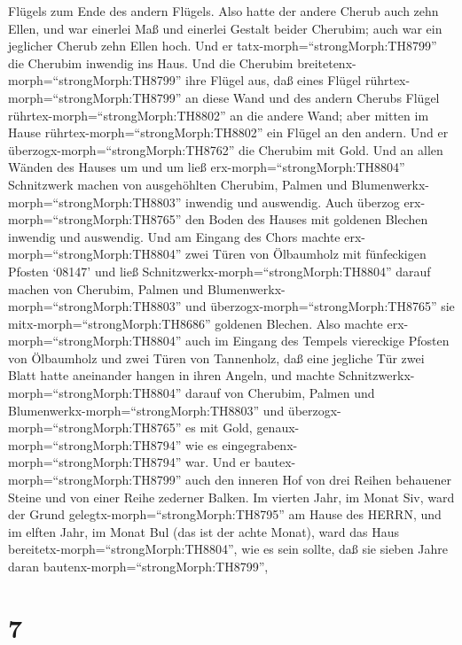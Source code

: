 Flügels zum Ende des andern Flügels.  Also hatte der andere
Cherub auch zehn Ellen, und war einerlei Maß und einerlei Gestalt beider
Cherubim;  auch war ein jeglicher Cherub zehn Ellen hoch.
 Und er tatx-morph=``strongMorph:TH8799'' die Cherubim
inwendig ins Haus. Und die Cherubim
breitetenx-morph=``strongMorph:TH8799'' ihre Flügel aus, daß eines
Flügel rührtex-morph=``strongMorph:TH8799'' an diese Wand und des andern
Cherubs Flügel rührtex-morph=``strongMorph:TH8802'' an die andere Wand;
aber mitten im Hause rührtex-morph=``strongMorph:TH8802'' ein Flügel an
den andern.  Und er überzogx-morph=``strongMorph:TH8762''
die Cherubim mit Gold.  Und an allen Wänden des Hauses um
und um ließ erx-morph=``strongMorph:TH8804'' Schnitzwerk machen von
ausgehöhlten Cherubim, Palmen und
Blumenwerkx-morph=``strongMorph:TH8803'' inwendig und auswendig.
 Auch überzog erx-morph=``strongMorph:TH8765'' den Boden
des Hauses mit goldenen Blechen inwendig und auswendig. 
Und am Eingang des Chors machte erx-morph=``strongMorph:TH8804'' zwei
Türen von Ölbaumholz mit fünfeckigen Pfosten  `08147' und
ließ Schnitzwerkx-morph=``strongMorph:TH8804'' darauf machen von
Cherubim, Palmen und Blumenwerkx-morph=``strongMorph:TH8803'' und
überzogx-morph=``strongMorph:TH8765'' sie
mitx-morph=``strongMorph:TH8686'' goldenen Blechen.  Also
machte erx-morph=``strongMorph:TH8804'' auch im Eingang des Tempels
viereckige Pfosten von Ölbaumholz  und zwei Türen von
Tannenholz, daß eine jegliche Tür zwei Blatt hatte aneinander hangen in
ihren Angeln,  und machte
Schnitzwerkx-morph=``strongMorph:TH8804'' darauf von Cherubim, Palmen
und Blumenwerkx-morph=``strongMorph:TH8803'' und
überzogx-morph=``strongMorph:TH8765'' es mit Gold,
genaux-morph=``strongMorph:TH8794'' wie es
eingegrabenx-morph=``strongMorph:TH8794'' war.  Und er
bautex-morph=``strongMorph:TH8799'' auch den inneren Hof von drei Reihen
behauener Steine und von einer Reihe zederner Balken.  Im
vierten Jahr, im Monat Siv, ward der Grund
gelegtx-morph=``strongMorph:TH8795'' am Hause des HERRN, 
und im elften Jahr, im Monat Bul (das ist der achte Monat), ward das
Haus bereitetx-morph=``strongMorph:TH8804'', wie es sein sollte, daß sie
sieben Jahre daran bautenx-morph=``strongMorph:TH8799'',

\hypertarget{section-6}{%
\section{7}\label{section-6}}

